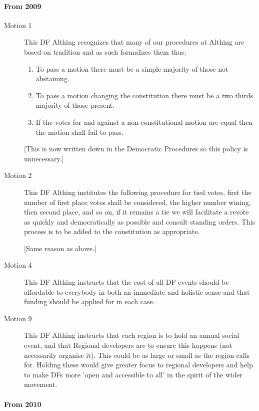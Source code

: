 \documentclass[a4paper, 11pt]{article} %
\begin{document}
\paragraph{From 2009}

\begin{description}
\item[Motion 1]  This DF Althing recognizes that many of our procedures at Althing are based on tradition and as such formalizes them thus:
	\begin{enumerate}
	\item To pass a motion there must be a simple majority of those not abstaining.
	\item To pass a motion changing the constitution there must be a two thirds majority of those present.
	\item If the votes for and against a non-constitutional motion are equal then the motion shall fail to pass.
	\end{enumerate}

[This is now written down in the Democratic Procedures so this policy is unnecessary.]

\item[Motion 2]  This DF Althing institutes the following procedure for tied votes, first the number of first place votes shall be considered, the higher number wining, then second place, and so on, if it remains a tie we will facilitate a revote as quickly and democratically as possible and consult standing orders. This process is to be added to the constitution as appropriate.

[Same reason as above.]

\item[Motion 4]  This DF Althing instructs that the cost of all DF events should be affordable to everybody in both an immediate and holistic sense and that funding should be applied for in each case.

\item[Motion 9]  This DF Althing instructs that each region is to hold an annual social event, and that Regional developers are to ensure this happens (not necessarily organise it). This could be as large or small as the region calls for. Holding these would give greater focus to regional developers and help to make DFs more 'open and accessible to all' in the spirit of the wider movement.
\end{description}

\paragraph{From 2010}
\end{document}
